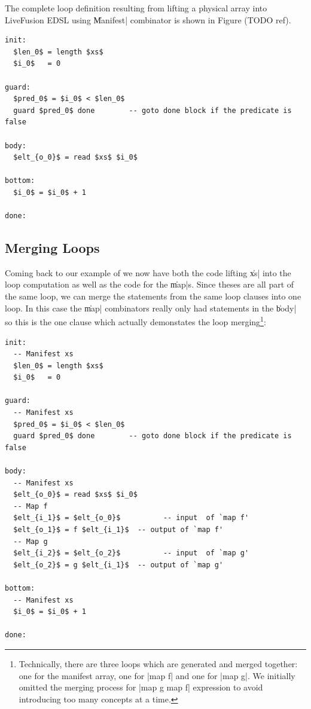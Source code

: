 \documentclass[preamble.tex]{subfiles}
\begin{document}
The complete loop definition resulting from lifting a physical array into LiveFusion EDSL using \|Manifest| combinator is shown in Figure (TODO ref).

\begin{lstlisting}[mathescape]
init:
  $len_0$ = length $xs$
  $i_0$   = 0

guard:
  $pred_0$ = $i_0$ < $len_0$
  guard $pred_0$ done        -- goto done block if the predicate is false

body:
  $elt_{o_0}$ = read $xs$ $i_0$

bottom:
  $i_0$ = $i_0$ + 1

done:

\end{lstlisting}


\subsection{Merging Loops}

Coming back to our example of  we now have both the code lifting \|xs| into the loop computation as well as the code for the \|map|s. Since theses are all part of the same loop, we can merge the statements from the same loop clauses into one loop. In this case the \|map| combinators really only had statements in the \|body| so this is the one clause which actually demonstates the loop merging\footnote{Technically, there are three loops which are generated and merged together: one for the manifest array, one for |map f| and one for |map g|. We initially omitted the merging process for |map g \compose map f| expression to avoid introducing too many concepts at a time.}:

\begin{lstlisting}[mathescape]
init:
  -- Manifest xs
  $len_0$ = length $xs$
  $i_0$   = 0

guard:
  -- Manifest xs
  $pred_0$ = $i_0$ < $len_0$
  guard $pred_0$ done        -- goto done block if the predicate is false

body:
  -- Manifest xs
  $elt_{o_0}$ = read $xs$ $i_0$
  -- Map f
  $elt_{i_1}$ = $elt_{o_0}$          -- input  of `map f'
  $elt_{o_1}$ = f $elt_{i_1}$  -- output of `map f'
  -- Map g
  $elt_{i_2}$ = $elt_{o_2}$          -- input  of `map g'
  $elt_{o_2}$ = g $elt_{i_1}$  -- output of `map g'

bottom:
  -- Manifest xs
  $i_0$ = $i_0$ + 1

done:

\end{lstlisting}
\end{document}
